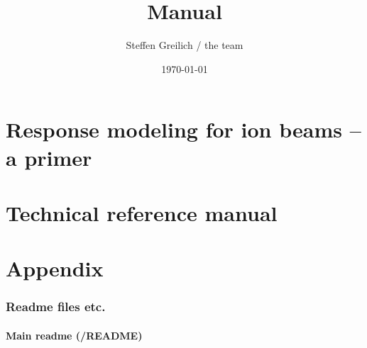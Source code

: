 \documentclass[10pt,a4paper]{book}
\title{\la{} Manual}
\author{Steffen Greilich / the \la{} team}
\date{\today}
\begin{document}
\maketitle

\tableofcontents



\part{Response modeling for ion beams -- a primer}







\part{Technical reference manual}









\part{Appendix}
\section{Readme files etc.}
\subsection{Main readme (/README)}

\lstset{fancyvrb=true,breaklines}



\end{document}
